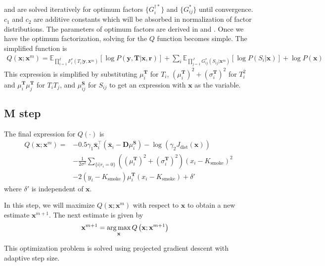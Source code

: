  and  are solved iteratively for optimum factors $ \lbrace G^{\dagger*}_i \rbrace $ and $ \lbrace G_{ij}^* \rbrace $ until convergence. $c_1$ and $c_2$ are additive constants which will be absorbed in normalization of factor distributions. The parameters of optimum factors are derived in  and .  Once we have the optimum factorization, solving for the $Q$ function becomes simple. The simplified function is
\begin{align}
Q(\mathbf{x}; \mathbf{x}^m) = \mathbb{E}_{ \prod_{i=1}^{I} F^*_i (T_i | \mathbf{y}, \mathbf{x}^m) } \left[ \log P \left( \mathbf{y}, \mathbf{T} | \mathbf{x}, \mathbf{r} \right) \right] + \sum_i \mathbb{E}_{ \prod_{j=1}^{J} G^*_{ij} \left( S_{ij} | \mathbf{x}^m \right) } \left[ \log P \left( S_i | \mathbf{x} \right) \right] + \log P \left( \mathbf{x} \right)
\end{align}
This expression is simplified by substituting $\mu^\mathbf{T}_i$ for $T_i$, $\left( \mu^\mathbf{T}_i \right)^2 + \left( \sigma^\mathbf{T}_i \right)^2$ for $T_i^2$ and $\mu^\mathbf{T}_i \mu^\mathbf{T}_j $ for $T_i T_j$, and $\mu^\mathbf{S}_{ij}$ for $S_{ij}$ to get an expression with $\mathbf{x}$ as the variable.


\subsection{M step}
The final expression for $Q \left( \cdot \right)$ is
\begin{equation}
\begin{split}
Q\left( \mathbf{x}; \mathbf{x}^m \right) =  &-0.5 \gamma_1 \mathbf{\bar{x}}^\intercal_i \left( \mathbf{\bar{x}}_i -  \mathbf{D} \mu^\mathbf{S}_i \right) - \log \left( \gamma_2 J_\text{dist}\left( \mathbf{x} \right) \right) \\
&- \frac{1}{2 \sigma^2} \sum_{\{i | r_i = 0 \}}  \left(
\left(\mu^\mathbf{T}_i\right)^2 + \left(\sigma^\mathbf{T}_i\right)^2\right) \left(x_i - K_\text{smoke}\right)^2 \\
&- 2 \left(y_i - K_\text{smoke}\right) \mu^\mathbf{T}_i \left(x_i - K_\text{smoke} \right) + \delta'
\end{split}
\end{equation}
where $\delta'$ is independent of $\mathbf{x}$.

In this step, we will maximize $Q(\mathbf{x}; \mathbf{x}^m)$ with respect to $\mathbf{x}$ to obtain a new estimate $\mathbf{x}^{m+1}$. The next estimate is given by
\begin{align}
    \mathbf{x}^{m+1} &= \operatorname*{arg\,max}_{\mathbf{x}} Q \left( \mathbf{x}; \mathbf{x}^{m+1} \right) \label{eqn:mStep}
\end{align}

This optimization problem is solved using projected gradient descent with adaptive step size.



